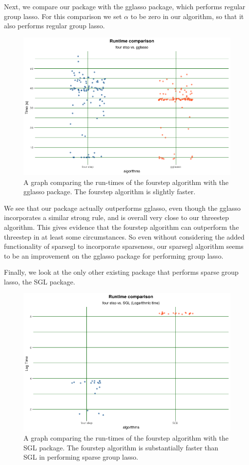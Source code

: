 \documentclass[12pt]{article}
\begin{document}
Next, we compare our package with the gglasso package, which performs regular group lasso. For this comparison we set $\alpha$ to be zero in our algorithm, so that it also performs regular group lasso. 

\begin{figure}[tb!]
\centering
\includegraphics[scale=0.5]{compare_fourgglasso.png}
\caption{A graph comparing the run-times of the fourstep algorithm with the gglasso package. The fourstep algorithm is slightly faster.}
\label{fig:1fourvsgglasso}
\end{figure}

We see that our package actually outperforms gglasso, even though the gglasso incorporates a similar strong rule, and is overall very close to our threestep algorithm. This gives evidence that the fourstep algorithm can outperform the threestep in at least some circumstances. So even without considering the added functionality of sparsegl to incorporate sparseness, our sparsegl algorithm seems to be an improvement on the gglasso package for performing group lasso.

Finally, we look at the only other existing package that performs sparse group lasso, the SGL package.


\begin{figure}[tb!]
\centering
\includegraphics[scale=0.5]{compare_fourSGL.png}
\caption{A graph comparing the run-times of the fourstep algorithm with the SGL package. The fourstep algorithm is substantially faster than SGL in performing sparse group lasso.}
\label{fig:fourvsSGL}
\end{figure}
\end{document}
